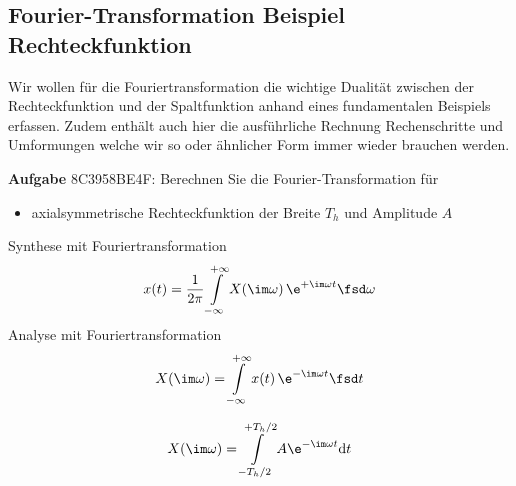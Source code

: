 \subsection{Fourier-Transformation Beispiel Rechteckfunktion}
\label{sec:8C3958BE4F}
\begin{Ziel}
Wir wollen für die Fouriertransformation die wichtige Dualität zwischen der
Rechteckfunktion und der Spaltfunktion anhand eines fundamentalen Beispiels erfassen.
Zudem enthält auch hier die ausführliche Rechnung Rechenschritte und Umformungen
welche wir so oder ähnlicher Form immer wieder brauchen werden.
\end{Ziel}
\textbf{Aufgabe} {\tiny 8C3958BE4F}: Berechnen Sie die Fourier-Transformation für
\begin{itemize}
\item axialsymmetrische Rechteckfunktion der Breite $T_h$ und Amplitude $A$
\end{itemize}

\begin{figure}[h!]
\centering
{}
\end{figure}

\begin{Werkzeug}
Synthese mit Fouriertransformation
\begin{align}
x(t) = \frac{1}{2\pi} \int\limits_{-\infty}^{+\infty} X(\im\omega) \, \e^{+\im \omega t} \fsd \omega
\end{align}
%
Analyse mit Fouriertransformation
\begin{align}
X(\im \omega) = \int\limits_{-\infty}^{+\infty} x(t) \, \e^{-\im \omega t} \fsd t
\end{align}
\end{Werkzeug}

\begin{Ansatz}
\begin{equation}
X(\im \omega) = \int\limits_{-T_h/2}^{+T_h/2} A \e^{-\im \omega t} \mathrm{d}t
\end{equation}
\end{Ansatz}

